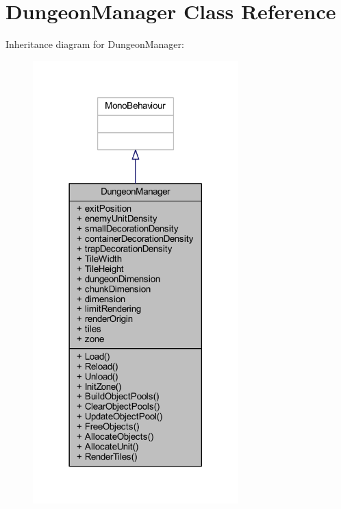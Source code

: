 \hypertarget{class_dungeon_manager}{}\section{Dungeon\+Manager Class Reference}
\label{class_dungeon_manager}


Inheritance diagram for Dungeon\+Manager\+:\nopagebreak
\begin{figure}[H]
\begin{center}
\leavevmode
\includegraphics[width=225pt]{class_dungeon_manager__inherit__graph}
\end{center}
\end{figure}



